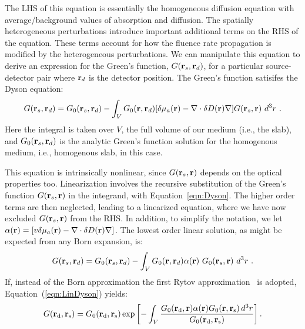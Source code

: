 The LHS of this equation is essentially the homogeneous diffusion equation with average/background values of absorption and diffusion. The spatially heterogeneous perturbations introduce important additional terms on the RHS of the equation. These terms account for how the fluence rate propagation is modified by the heterogeneous perturbations. We can manipulate this equation to derive an expression for the Green's function, $G(\mathbf{r}_s,\mathbf{r}_d)$, for a particular source-detector pair where $\mathbf{r}_d$ is the detector position. The Green's function satisifes the Dyson equation:
\begin{equation}
\label{eqn:Dyson}
G(\mathbf{r}_s,\mathbf{r}_d) = G_0(\mathbf{r}_s,\mathbf{r}_d) - \int_V G_0(\mathbf{r},\mathbf{r}_d) [\delta\mu_a(\mathbf{r}) - \nabla \cdot \delta D(\mathbf{r}) \nabla] G(\mathbf{r}_s,\mathbf{r}) \ d^3 r \ .
\end{equation}
\noindent
Here the integral is taken over $V$, the full volume of our medium (i.e., the slab), and $G_0(\mathbf{r}_s,\mathbf{r}_d)$ is the analytic Green's function solution for the homogenous medium, i.e., homogenous slab, in this case.

This equation is intrinsically nonlinear, since $G(\mathbf{r}_s,\mathbf{r})$ depends on the optical properties too. Linearization involves the recursive substitution of the Green's function $G(\mathbf{r}_s,\mathbf{r})$ in the integrand, with Equation~\ref{eqn:Dyson}. The higher order terms are then neglected, leading to a linearized equation, where we have now excluded $G(\mathbf{r}_s,\mathbf{r})$ from the RHS. In addition, to simplify the notation, we let $\alpha(\mathbf{r})=[v\delta\mu_a(\mathbf{r}) - \nabla \cdot \delta D(\mathbf{r}) \nabla]$. The lowest order linear solution, as might be expected from any Born expansion, is: 
\begin{align}
\label{eqn:LinDyson}
G(\mathbf{r}_s,\mathbf{r}_d) = G_0(\mathbf{r}_s,\mathbf{r}_d) - \int_V G_0(\mathbf{r},\mathbf{r}_d) \alpha(\mathbf{r}) \
G_0(\mathbf{r}_s,\mathbf{r}) \ d^3 r \ .
\end{align}
\noindent
If, instead of the Born approximation the first Rytov approximation~\cite{Schotland1997} is adopted, Equation~(\ref{eqn:LinDyson}) yields: 
\begin{equation}
\label{eqn:linearDE}
G(\mathbf{r}_{\rm d}, \mathbf{r}_{\rm s}) = G_0(\mathbf{r}_{\rm d}, \mathbf{r}_{\rm s})
\exp\left[ -\int_V \frac{ G_0(\mathbf{r}_{\rm d}, \mathbf{r}) \alpha(\mathbf{r})
G_0(\mathbf{r}, \mathbf{r}_{\rm s})\,d^3r}{G_0(\mathbf{r}_{\rm d}, \mathbf{r}_{\rm s})} \right] .
\end{equation}

